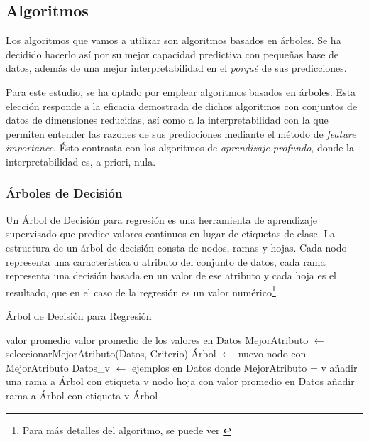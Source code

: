 \documentclass[12pt]{article}
\begin{document}
\subsection{Algoritmos}

Los algoritmos que vamos a utilizar son algoritmos basados en árboles. Se ha decidido hacerlo así por su mejor capacidad predictiva con pequeñas base de datos, además de una mejor interpretabilidad en el \textit{porqué} de sus predicciones.



Para este estudio, se ha optado por emplear algoritmos basados en árboles. Esta elección responde a la eficacia demostrada de dichos algoritmos con conjuntos de datos de dimensiones reducidas, así como a la interpretabilidad con la que permiten entender las razones de sus predicciones mediante el método de \textit{feature importance}. Ésto contrasta con los algoritmos de \textit{aprendizaje profundo}, donde la interpretabilidad es, a priori, nula.

\subsubsection{Árboles de Decisión}

Un Árbol de Decisión para regresión es una herramienta de aprendizaje supervisado que predice valores continuos en lugar de etiquetas de clase. La estructura de un árbol de decisión consta de nodos, ramas y hojas. Cada nodo representa una característica o atributo del conjunto de datos, cada rama representa una decisión basada en un valor de ese atributo y cada hoja es el resultado, que en el caso de la regresión es un valor numérico\footnote{Para más detalles del algoritmo, se puede ver \cite{adaboost}}.

\begin{algorithm}
\caption{Árbol de Decisión para Regresión}
\begin{algorithmic}
        \State \Return valor promedio
    \EndIf
        \State \Return valor promedio de los valores en Datos
    \EndIf
    \State MejorAtributo $\leftarrow$ seleccionarMejorAtributo(Datos, Criterio)
    \State Árbol $\leftarrow$ nuevo nodo con MejorAtributo
        \State Datos\_v $\leftarrow$ ejemplos en Datos donde MejorAtributo = v
            \State añadir una rama a Árbol con etiqueta v
            \State nodo hoja con valor promedio en Datos
        \Else
            \State añadir rama a Árbol con etiqueta v
            \State {}
        \EndIf
    \EndFor
    \Return Árbol
\EndProcedure
\end{algorithmic}
\end{algorithm}
\end{document}
